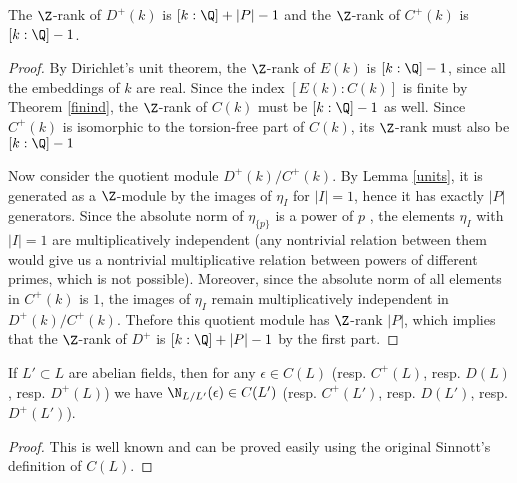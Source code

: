 \begin{prop}\label{Drank}
The $\Z$-rank of $D^+(k)$ is $[k:\Q]+|P|-1$ and the $\Z$-rank of $C^+(k)$ is $[k:\Q]-1$.
\end{prop}
\begin{proof}
By Dirichlet's unit theorem, the $\Z$-rank of $E(k)$ is $[k:\Q]-1$, since all the embeddings of $k$ are real. Since the index $[E(k):C(k)]$ is finite by Theorem \ref{finind},  the $\Z$-rank of $C(k)$ must be $[k:\Q]-1$ as well. Since $C^+(k)$ is isomorphic to the torsion-free part of $C(k)$, its $\Z$-rank must also be $[k:\Q]-1$

Now consider the quotient module $D^+(k)/C^+(k)$. By Lemma \ref{units}, it is generated as a $\Z$-module by the images of $\eta_I$ for $|I|=1$, hence it has exactly $|P|$ generators. Since the absolute norm of $\eta_{\{p\}}$ is a power of $p$%
, the elements $\eta_I$ with $|I|=1$ are multiplicatively independent (any nontrivial relation between them would give us a nontrivial multiplicative relation between powers of different primes, which is not possible). Moreover, since the absolute norm of all elements in $C^+(k)$ is $1$, the images of $\eta_I$ remain multiplicatively independent in $D^+(k)/C^+(k)$. Thefore this quotient module has $\Z$-rank $|P|$, which implies that the $\Z$-rank of $D^+$ is $[k:\Q]+|P|-1$ by the first part.
\end{proof}

\begin{lemma}\label{NoFrob}
If $L' \subset L$ are abelian fields, then for any $\epsilon\in C(L)$ (resp. $C^+(L)$, resp. $D(L)$, resp. $D^+(L)$) we have $\N_{L/L'}(\epsilon)\in C(L')$ (resp. $C^+(L')$, resp. $D(L')$, resp. $D^+(L')$).
\end{lemma}
\begin{proof}
This is well known and can be proved easily using the original Sinnott's definition of $C(L)$.
\end{proof}


